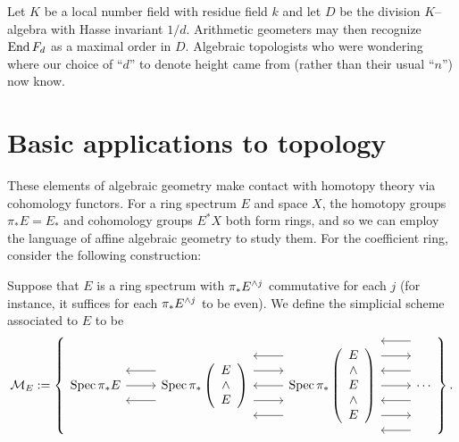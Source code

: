 \begin{remark}
Let $K$ be a local number field with residue field $k$ and let $D$ be the division $K$--algebra with Hasse invariant $1/d$.  Arithmetic geometers may then recognize $\operatorname{End} F_d$ as a maximal order in $D$.  Algebraic topologists who were wondering where our choice of ``$d$'' to denote height came from (rather than their usual ``$n$'') now know.
\end{remark}




\section*{Basic applications to topology}\label{BasicApplicationsToTopology}

These elements of algebraic geometry make contact with homotopy theory via cohomology functors.  For a ring spectrum $E$ and space $X$, the homotopy groups $\pi_* E = E_*$ and cohomology groups $E^* X$ both form rings, and so we can employ the language of affine algebraic geometry to study them.  For the coefficient ring, consider the following construction:

\begin{definition}\label{RingSpToStackDefn}
Suppose that $E$ is a ring spectrum with $\pi_* E^{\wedge j}$ commutative for each $j$ (for instance, it suffices for each $\pi_* E^{\wedge j}$ to be even).  We define the simplicial scheme associated to $E$ to be \[\mathcal{M}_E := \left\{
\begin{tikzcd}
\Spec \pi_* E \arrow{r} \arrow[leftarrow,shift left=\baselineskip]{r} \arrow[leftarrow,shift right=\baselineskip]{r} & \Spec \pi_* \left( \begin{array}{c} E \\ \sm \\ E \end{array} \right) \arrow[leftarrow, shift left=(2*\baselineskip)]{r} \arrow[shift left=\baselineskip]{r} \arrow[leftarrow]{r} \arrow[shift right=\baselineskip]{r} \arrow[leftarrow, shift right=(2*\baselineskip)]{r} & \Spec \pi_* \left( \begin{array}{c} E \\ \sm \\ E \\ \sm \\ E \end{array} \right) \arrow[leftarrow, shift left=(3*\baselineskip)]{r} \arrow[shift left=(2*\baselineskip)]{r} \arrow[leftarrow, shift left=\baselineskip]{r} \arrow{r} \arrow[leftarrow, shift right=\baselineskip]{r} \arrow[shift right=(2*\baselineskip)]{r} \arrow[leftarrow, shift right=(3*\baselineskip)]{r} & \cdots
\end{tikzcd}
\right\}.\]
\end{definition}

